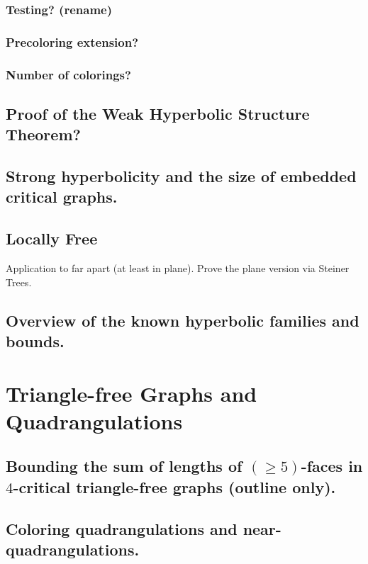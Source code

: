 \documentclass[12pt,twoside,openright,a4paper]{book}
\begin{document}
\subsection{Testing? (rename)}

\subsection{Precoloring extension?}
\subsection{Number of colorings?}

\section{Proof of the Weak Hyperbolic Structure Theorem?}

\section{Strong hyperbolicity and the size of embedded critical graphs.}

\section{Locally Free}

Application to far apart (at least in plane). Prove the plane version via Steiner Trees.

\section{Overview of the known hyperbolic families and bounds.}


\chapter{Triangle-free Graphs and Quadrangulations}\label{chap:trfree}


\section{Bounding the sum of lengths of $(\ge\!5)$-faces in $4$-critical triangle-free graphs (outline only).}
\section{Coloring quadrangulations and near-quadrangulations.}
\end{document}
